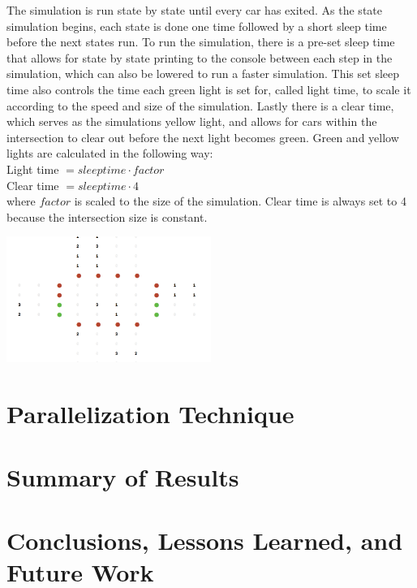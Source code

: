 \documentclass[conference]{IEEEtran}
\begin{document}
\hspace*{.2cm}  The simulation is run state by state until every car has exited. As the state simulation begins, each state is done one time followed by a short sleep time before the next states run. To run the simulation, there is a pre-set sleep time that allows for state by state printing to the console between each step in the simulation, which can also be lowered to run a faster simulation. This set sleep time also controls the time each green light is set for, called light time, to scale it according to the speed and size of the simulation. Lastly there is a clear time, which serves as the simulations yellow light, and allows for cars within the intersection to clear out before the next light becomes green. Green and yellow lights are calculated in the following way: \\

Light time $= sleep time \cdot factor$ \\

Clear time $= sleep time \cdot 4$ \\

where $factor$ is scaled to the size of the simulation. Clear time is always set to 4 because the intersection size is constant.

\includegraphics[width=0.5\textwidth]{green}




\section{Parallelization Technique}
\lipsum[3] \cite{ORourke2005}

\section{Summary of Results}
\lipsum[4]

\section{Conclusions, Lessons Learned, and Future Work}
\lipsum[5]



\end{document}
